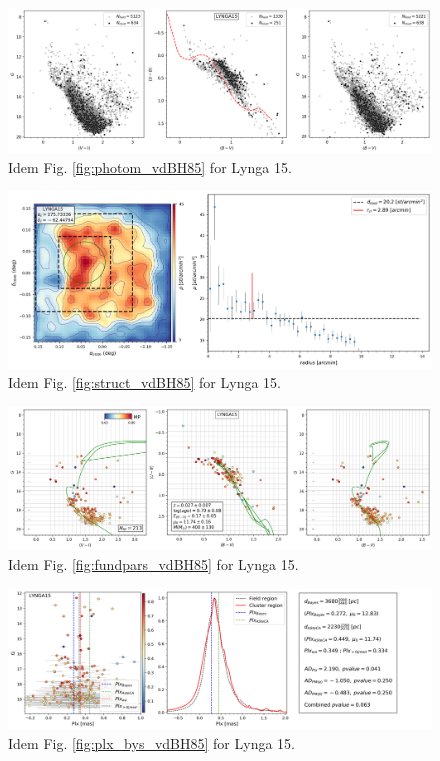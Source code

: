 \documentclass[referee]{aa}
\begin{document}
\begin{figure}[ht]
    \centering
    \includegraphics[width=\hsize]{../figs/obs_LYNGA15.png}
    \caption{Idem Fig. \ref{fig:photom_vdBH85} for Lynga 15.}
    \label{fig51}
\end{figure}
\begin{figure}[ht]
    \centering
    \includegraphics[width=\hsize]{../figs/dmap_lynga15.png}
    \caption{Idem Fig. \ref{fig:struct_vdBH85} for Lynga 15.}
    \label{fig52}
\end{figure}
\begin{figure}[ht]
    \centering
    \includegraphics[width=\hsize]{../figs/cmds_lynga15.png}
    \caption{Idem Fig. \ref{fig:fundpars_vdBH85} for Lynga 15.}
    \label{fig53}
\end{figure}
\begin{figure}[ht]
    \centering
    \includegraphics[width=\hsize]{../figs/plx_LYNGA15.png}
    \caption{Idem Fig. \ref{fig:plx_bys_vdBH85} for Lynga 15.}
    \label{fig54}
\end{figure}
\end{document}
